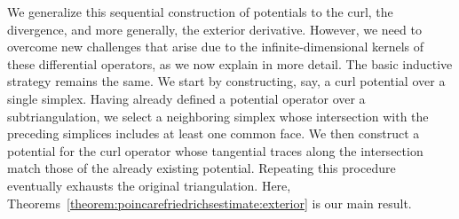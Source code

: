 \documentclass[10pt,a4paper]{article}
\newcommand\cye[1]{%
\protect\leavevmode
\begingroup
    \color{blue}%
    #1%
\endgroup
}
\begin{document}

We generalize this sequential construction of potentials to the curl, the divergence, and more generally, the exterior derivative. 
However, we need to overcome new challenges that arise due to the infinite-dimensional kernels of these differential operators, as we now explain in more detail. 
The basic inductive strategy remains the same. 
We start by constructing, say, a curl potential over a single simplex. 
Having already defined a potential operator over a subtriangulation, we select a neighboring simplex whose intersection with the preceding simplices includes at least one common face. 
We then construct a potential for the curl operator whose tangential traces along the intersection match those of the already existing potential.
Repeating this procedure eventually exhausts the original triangulation. 
Here, Theorems~\ref{theorem:poincarefriedrichsestimate:exterior} is our main result. 
\end{document}
